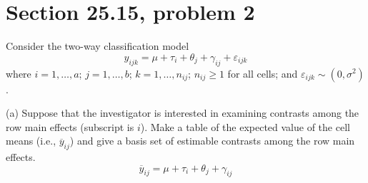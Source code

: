 \section{Section 25.15, problem 2}
Consider the two-way classification model
\[
y_{ijk}=\mu+\tau_i+\theta_j+\gamma_{ij}+\varepsilon_{ijk}
\]
where $i=1,\ldots,a$; $j=1,\ldots,b$;
$k=1,\ldots,n_{ij}$; $n_{ij}\ge1$ for all cells; and
$\varepsilon_{ijk}\sim(0,\sigma^2)$.

\bigskip
\noindent
(a) Suppose that the investigator is interested in examining contrasts
among the row main effects (subscript is $i$).
Make a table of the expected value of the cell means
(i.e., $\overline{y}_{ij}$) and give a basis set of
estimable contrasts among the row main effects.
\[
\overline{y}_{ij}=\mu+\tau_i+\theta_j+\gamma_{ij}
\]
